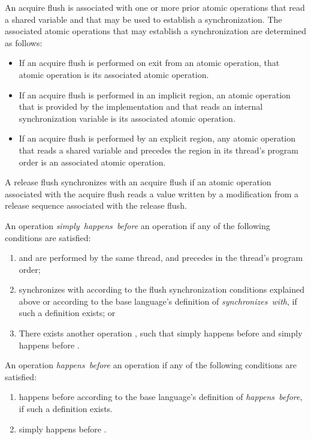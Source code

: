 An acquire flush is associated with one or more prior atomic operations that
read a shared variable and that may be used to establish a synchronization.
The associated atomic operations that may establish a synchronization are
determined as follows:

\begin{itemize}
\item If an acquire flush is performed on exit from an atomic operation, that
    atomic operation is its associated atomic operation.
\item If an acquire flush is performed in an implicit  region, an  
    atomic operation that is provided by the implementation and that reads an 
    internal synchronization variable is its associated atomic operation.
\item If an acquire flush is performed by an explicit  region, any
    atomic operation that reads a shared variable and precedes the
     region in its thread's program order is an associated atomic
    operation.
\end{itemize}

A release flush synchronizes with an acquire flush if an atomic operation
associated with the acquire flush reads a value written by a modification from
a release sequence associated with the release flush.

An operation  \emph{simply~happens~before} an operation  
if any of the following conditions are satisfied:
\begin{enumerate}
\item {} and  are performed by the same thread, and  
      precedes  in the thread's program order;
\item {} synchronizes with  according to the flush 
      synchronization conditions explained above or according
      to the base language's definition of \emph{synchronizes~with}, 
      if such a definition exists; or
\item There exists another operation , such that  simply 
      happens before  and  simply happens before .
\end{enumerate}

An operation  \emph{happens~before} an operation  if any of the following conditions are satisfied:
\begin{enumerate}
\item {} happens before  according to the base language's definition of \emph{happens~before}, if such a definition exists.
\item {} simply happens before .
\end{enumerate}

